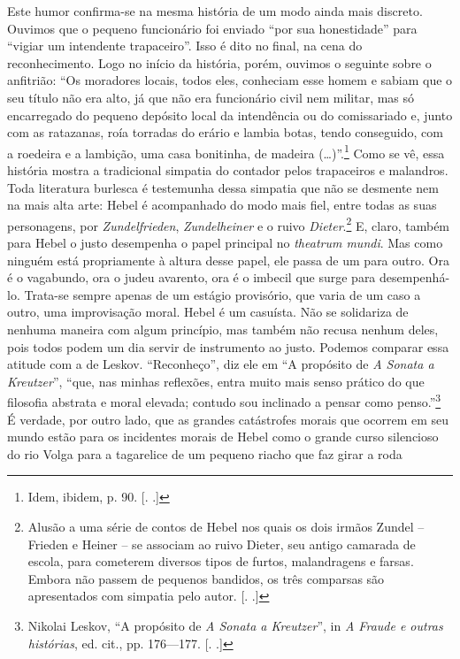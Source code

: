Este humor confirma-se na mesma história de um modo ainda mais discreto.
Ouvimos que o pequeno funcionário foi enviado ``por sua honestidade''
para ``vigiar um intendente trapaceiro''. Isso é dito no final, na cena
do reconhecimento. Logo no início da história, porém, ouvimos o seguinte
sobre o anfitrião: ``Os moradores locais, todos eles, conheciam esse
homem e sabiam que o seu título não era alto, já que não era funcionário
civil nem militar, mas só encarregado do pequeno depósito local da
intendência ou do comissariado e, junto com as ratazanas, roía torradas
do erário e lambia botas, tendo conseguido, com a roedeira e a lambição,
uma casa bonitinha, de madeira (\ldots{})''.\footnote{Idem, ibidem, p. 90.
  [. .]} Como se vê, essa história mostra a tradicional
simpatia do contador pelos trapaceiros e malandros. Toda literatura
burlesca é testemunha dessa simpatia que não se desmente nem na mais
alta arte: Hebel é acompanhado do modo mais fiel, entre todas as suas
personagens, por \emph{Zundelfrieden}, \emph{Zundelheiner} e o ruivo
\emph{Dieter}.\footnote{Alusão a uma série de contos de Hebel nos quais
  os dois irmãos Zundel -- Frieden e Heiner -- se associam ao ruivo
  Dieter, seu antigo camarada de escola, para cometerem diversos tipos
  de furtos, malandragens e farsas. Embora não passem de pequenos
  bandidos, os três comparsas são apresentados com simpatia pelo autor.
  [. .]} E, claro, também para Hebel o justo desempenha o papel
principal no \emph{theatrum mundi}. Mas como ninguém está propriamente à
altura desse papel, ele passa de um para outro. Ora é o vagabundo, ora o
judeu avarento, ora é o imbecil que surge para desempenhá-lo. Trata-se
sempre apenas de um estágio provisório, que varia de um caso a outro,
uma improvisação moral. Hebel é um casuísta. Não se solidariza de
nenhuma maneira com algum princípio, mas também não recusa nenhum deles,
pois todos podem um dia servir de instrumento ao justo. Podemos comparar
essa atitude com a de Leskov. ``Reconheço'', diz ele em ``A propósito de
\emph{A Sonata a Kreutzer}'', ``que, nas minhas reflexões, entra muito
mais senso prático do que filosofia abstrata e moral elevada; contudo
sou inclinado a pensar como penso.''\footnote{Nikolai Leskov, ``A
  propósito de \emph{A Sonata a Kreutzer}'', in \emph{A Fraude e outras
  histórias}, ed. cit., pp. 176---177. [. .]} É verdade, por
outro lado, que as grandes catástrofes morais que ocorrem em seu mundo
estão para os incidentes morais de Hebel como o grande curso silencioso
do rio Volga para a tagarelice de um pequeno riacho que faz girar a roda
